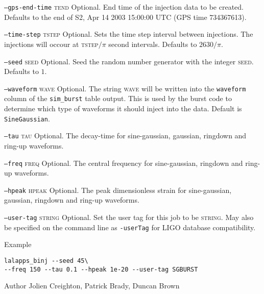 \begin{entry}
\begin{entry}
\item[\texttt{--gps-end-time} \textsc{tend}]
Optional. End time of the injection data to be created. Defaults to the end of
S2, Apr 14 2003 15:00:00 UTC (GPS time 734367613).

\item[\texttt{--time-step} \textsc{tstep}]
Optional. Sets the time step interval between injections. The injections will
occour at \textsc{tstep}$/\pi$ second intervals. Defaults to $2630/\pi$.

\item[\texttt{--seed} \textsc{seed}]
Optional. Seed the random number generator with the integer \textsc{seed}.
Defaults to $1$.

\item[\texttt{--waveform} \textsc{wave}]
Optional. The string \textsc{wave} will be written into the \texttt{waveform}
column of the \texttt{sim\_burst} table output. This is used by the
burst code to determine which type of waveforms it should inject into the
data. Default is \texttt{SineGaussian}.

\item[\texttt{--tau} \textsc{tau}]
Optional.  The decay-time for sine-gaussian,  gaussian,  ringdown and
ring-up waveforms.

\item[\texttt{--freq} \textsc{freq}]
Optional.  The central frequency for sine-gaussian,  ringdown and
ring-up waveforms.

\item[\texttt{--hpeak} \textsc{hpeak}]
Optional.  The peak dimensionless strain for sine-gaussian,  gaussian,  ringdown and
ring-up waveforms.

\item[\texttt{--user-tag} \textsc{string}] Optional. Set the user tag for this
job to be \textsc{string}. May also be specified on the command line as 
\texttt{-userTag} for LIGO database compatibility.

\end{entry}

\item[Example]
\begin{verbatim}
lalapps_binj --seed 45\
--freq 150 --tau 0.1 --hpeak 1e-20 --user-tag SGBURST
\end{verbatim}

\item[Author] 
Jolien Creighton, Patrick Brady, Duncan Brown
\end{entry}

